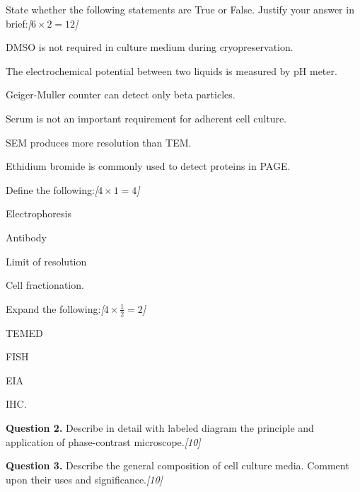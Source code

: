 \documentclass[11pt,a4paper]{article}
\newcommand{\pts}[1]{\hfill   \textit{[#1]}}
\begin{document}
\begin{parts}
  \item State whether the following statements are True or False. Justify your answer in brief:\pts{$6  \times 2 = 12$}
  
\begin{parts}
    \item DMSO is not required in culture medium during cryopreservation.
    \item The electrochemical potential between two liquids is measured by pH meter.
    \item Geiger-Muller counter can detect only beta particles.
    \item Serum is not an important requirement for adherent cell culture.
    \item SEM produces more resolution than TEM.
    \item Ethidium bromide is commonly used to detect proteins in PAGE.
  \end{parts}

  \item Define the following:\pts{$4  \times 1 = 4$}
  
\begin{parts}
    \item Electrophoresis
    \item Antibody
    \item Limit of resolution
    \item Cell fractionation.
  \end{parts}

  \item Expand the following:\pts{$4  \times \frac{1}{2} = 2$}
  
\begin{parts}
    \item TEMED
    \item FISH
    \item EIA
    \item IHC.
  \end{parts}
\end{parts}

\pagebreak

\medskip


\noindent   \textbf{Question 2.} Describe in detail with labeled diagram the principle and application of phase-contrast microscope.\pts{10}

\medskip


\noindent   \textbf{Question 3.} Describe the general composition of cell culture media. Comment upon their uses and significance.\pts{10}
\end{document}
